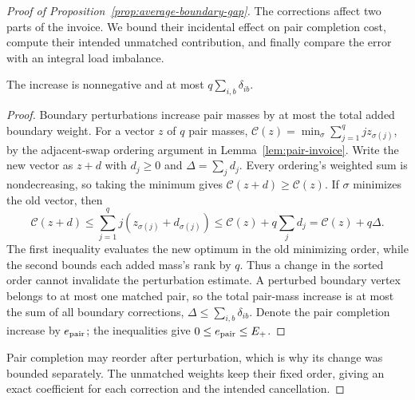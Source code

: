 \begin{proof}[Proof of Proposition~\ref{prop:average-boundary-gap}]
The corrections affect two parts of the invoice. We bound their
incidental effect on pair completion cost, compute their intended
unmatched contribution, and finally compare the error with an
integral load imbalance.

\begin{claim}
\label{clm:average-pair-perturbation}
The increase is nonnegative and at most $q\sum_{i,b}\delta_{ib}$.
\end{claim}
\begin{proof}
Boundary perturbations increase pair masses by at most the total
added boundary weight. For a vector $z$ of $q$ pair masses,
$\mathcal C(z)=\min_\sigma\sum_{j=1}^q jz_{\sigma(j)}$, by the
adjacent-swap ordering argument in Lemma~\ref{lem:pair-invoice}.
Write the new vector as $z+d$ with $d_j\ge0$ and
$\Delta=\sum_jd_j$. Every ordering's weighted sum is nondecreasing,
so taking the minimum gives $\mathcal C(z+d)\ge\mathcal C(z)$.
If $\sigma$ minimizes the old vector, then
\[
 \mathcal C(z+d)
 \le\sum_{j=1}^q j(z_{\sigma(j)}+d_{\sigma(j)})
 \le\mathcal C(z)+q\sum_jd_j
 =\mathcal C(z)+q\Delta.
\]
The first inequality evaluates the new optimum in the old minimizing
order, while the second bounds each added mass's rank by $q$.
Thus a change in the sorted order cannot invalidate the perturbation
estimate.
A perturbed boundary vertex belongs to at most one matched pair,
so the total pair-mass increase is at most the sum of all boundary
corrections, $\Delta\le\sum_{i,b}\delta_{ib}$. Denote the pair
completion increase by $e_{\rm pair}$; the inequalities give
$0\le e_{\rm pair}\le E_+$.
\end{proof}
Pair completion may reorder after perturbation, which is why its
change was bounded separately. The unmatched weights keep their fixed
order, giving an exact coefficient for each correction and the
intended cancellation.


\end{proof}
